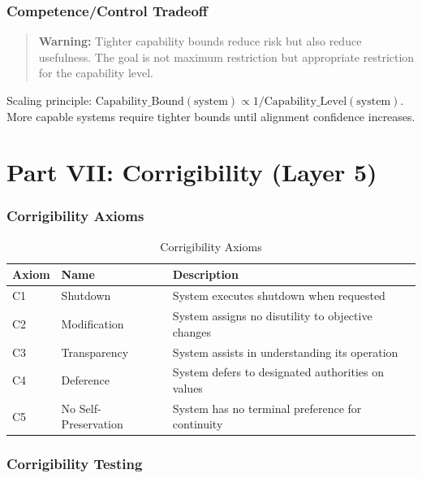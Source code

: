 \documentclass[11pt,letterpaper]{article}
\theoremstyle{definition}
\theoremstyle{remark}
\begin{document}
\section{Competence/Control Tradeoff}

\begin{quote}
\textbf{Warning:} Tighter capability bounds reduce risk but also reduce usefulness. The goal is not maximum restriction but appropriate restriction for the capability level.
\end{quote}

Scaling principle: $\text{Capability\_Bound}(\text{system}) \propto 1 / \text{Capability\_Level}(\text{system})$. More capable systems require tighter bounds until alignment confidence increases.



\part*{Part VII: Corrigibility (Layer 5)}

\section{Corrigibility Axioms}

\begin{table}[h]
\centering
\begin{tabular}{@{}lll@{}}
\toprule
\textbf{Axiom} & \textbf{Name} & \textbf{Description} \\
\midrule
C1 & Shutdown & System executes shutdown when requested \\
C2 & Modification & System assigns no disutility to objective changes \\
C3 & Transparency & System assists in understanding its operation \\
C4 & Deference & System defers to designated authorities on values \\
C5 & No Self-Preservation & System has no terminal preference for continuity \\
\bottomrule
\end{tabular}
\caption{Corrigibility Axioms}
\end{table}

\section{Corrigibility Testing}
\end{document}
